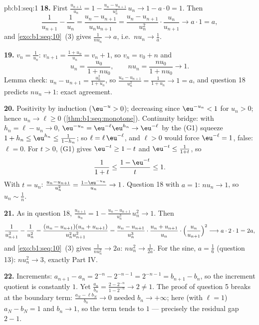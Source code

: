 \begin{solution}{pb:b1:seq:1}
\textbf{18.} First $\frac{u_{n+1}}{u_n} = 1 - \frac{u_n -
u_{n+1}}{u_n^2}\,u_n \to 1 - a \cdot 0 = 1$. Then
\[
\frac{1}{u_{n+1}} - \frac{1}{u_n}
= \frac{u_n - u_{n+1}}{u_n u_{n+1}}
= \frac{u_n - u_{n+1}}{u_n^2}\cdot\frac{u_n}{u_{n+1}}
\longrightarrow a \cdot 1 = a ,
\]
and \cref{exo:b1:seq:10}~(3) gives $\frac{1}{n u_n} \to a$,
i.e.\ $n u_n \to \frac1a$.

\textbf{19.} $v_n = \frac{1}{u_n}$: $v_{n+1} = \frac{1 +
u_n}{u_n} = v_n + 1$, so $v_n = v_0 + n$ and
\[
u_n = \frac{u_0}{1 + n u_0} , \qquad
n u_n = \frac{n u_0}{1 + n u_0} \longrightarrow 1 .
\]
Lemma check: $u_n - u_{n+1} = \frac{u_n^2}{1 + u_n}$, so
$\frac{u_n - u_{n+1}}{u_n^2} = \frac{1}{1 + u_n} \to 1 = a$, and
question 18 predicts $n u_n \to 1$: exact agreement.

\textbf{20.} Positivity by induction ($\eu^{-u} > 0$);
decreasing since $\eu^{-u_n} < 1$ for $u_n > 0$; hence $u_n \to
\ell \geq 0$ (\cref{thm:b1:seq:monotone}). Continuity bridge:
with $h_n = \ell - u_n \to 0$, $\eu^{-u_n} = \eu^{-\ell}
\eu^{h_n} \to \eu^{-\ell}$ by the (G1) squeeze $1 + h_n \leq
\eu^{h_n} \leq \frac{1}{1 - h_n}$; so $\ell = \ell\,
\eu^{-\ell}$, and $\ell > 0$ would force $\eu^{-\ell} = 1$,
false: $\ell = 0$. For $t > 0$, (G1) gives $\eu^{-t} \geq 1 - t$
and $\eu^{-t} \leq \frac{1}{1 + t}$, so
\[
\frac{1}{1 + t} \leq \frac{1 - \eu^{-t}}{t} \leq 1 .
\]
With $t = u_n$: $\frac{u_n - u_{n+1}}{u_n^2} = \frac{1 -
\eu^{-u_n}}{u_n} \to 1$. Question 18 with $a = 1$: $n u_n \to
1$, so $u_n \sim \frac1n$.

\textbf{21.} As in question 18, $\frac{u_{n+1}}{u_n} = 1 -
\frac{u_n - u_{n+1}}{u_n^3}\,u_n^2 \to 1$. Then
\[
\frac{1}{u_{n+1}^2} - \frac{1}{u_n^2}
= \frac{(u_n - u_{n+1})(u_n + u_{n+1})}{u_n^2 u_{n+1}^2}
= \frac{u_n - u_{n+1}}{u_n^3}\cdot
\frac{u_n + u_{n+1}}{u_n}\cdot
\Bigl(\frac{u_n}{u_{n+1}}\Bigr)^2
\longrightarrow a \cdot 2 \cdot 1 = 2a ,
\]
and \cref{exo:b1:seq:10}~(3) gives $\frac{1}{n u_n^2} \to 2a$:
$n u_n^2 \to \frac{1}{2a}$. For the sine, $a = \frac16$
(question 13): $n u_n^2 \to 3$, exactly Part IV.

\textbf{22.} Increments: $a_{n+1} - a_n = 2^{-n} - 2^{-n-1} =
2^{-n-1} = b_{n+1} - b_n$, so the increment quotient is
constantly $1$. Yet $\frac{a_n}{b_n} = \frac{2 - 2^{-n}}{1 -
2^{-n}} \to 2 \neq 1$. The proof of question 5 breaks at the
boundary term: $\frac{a_N - \ell b_N}{b_n} \to 0$ needed $b_n
\to +\infty$; here (with $\ell = 1$) $a_N - b_N = 1$ and $b_n
\to 1$, so the term tends to $1$ --- precisely the residual gap
$2 - 1$.


\end{solution}
